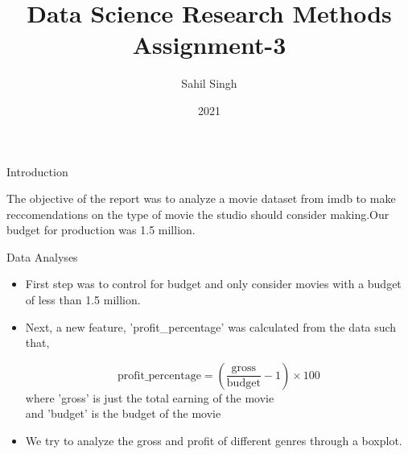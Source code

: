 \documentclass{beamer}
\title{Data Science Research Methods Assignment-3}
\author{Sahil Singh}
\institute{University of Sussex}
\date{2021}
\begin{document}
\frame{\titlepage}

\begin{frame}{Introduction}

The objective of the report was to analyze a movie dataset from imdb to make reccomendations on the type of movie the studio should consider making.Our budget for production was 1.5 million.

\end{frame}
\begin{frame}{Data Analyses}
\begin{itemize}
    \item First step was to control for budget and only consider movies with a budget of less than 1.5 million.
    \item Next, a new feature, 'profit\_percentage' was calculated from the data such that,\\
    \begin{tcolorbox}[colback=red!5,colframe=green!75!black,title=]
	    $$\text{profit\_percentage}=\left(\frac{\text{gross}}{\text{budget}}-1\right)\times100$$
	    \tcblower
	    where 'gross' is just the total earning of the movie\\
	    and 'budget' is the budget of the movie

\end{tcolorbox} 

    \item We try to analyze the gross and profit of different genres through a boxplot.
	\\[1ex]
\end{itemize}

%
%
%
%


\end{frame}
\end{document}
